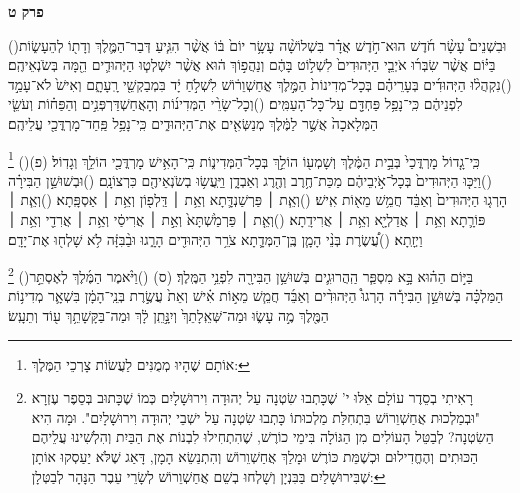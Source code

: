 \documentclass[12pt, openany]{book}
\newcommand{\chapname}{}
\newcommand{\newchap}[1]{
	\addcontentsline{toc}{chapter}{#1}
	\renewcommand{\chapname}{#1}
		\begin{center}
			\textbf{%
\fontsize{16pt}{16pt}\selectfont
				#1}
		\end{center}
}
\newcommand{\footnotecomment}[1]{
	\renewcommand\thefootnote{}
	\footnote{\textsf{#1}}}
\newcommand{\commenta}[1]{\footnotecomment{#1}\hspace{0em}}
\newcommand{\vsnum}[1]{(\hebrewnumeral{#1})\space}
\begin{document}
\newchap{פרק ט}
\begin{multicols}{2}
\vsnum{1}וּבִשְׁנֵים֩ עָשָׂ֨ר חֹ֜דֶשׁ הוּא־חֹ֣דֶשׁ אֲדָ֗ר בִּשְׁלוֹשָׁ֨ה עָשָׂ֥ר יוֹם֙ בּ֔וֹ אֲשֶׁ֨ר הִגִּ֧יעַ דְּבַר־הַמֶּ֛לֶךְ וְדָת֖וֹ לְהֵעָשׂ֑וֹת בַּיּ֗וֹם אֲשֶׁ֨ר שִׂבְּר֜וּ אֹיְבֵ֤י הַיְּהוּדִים֙ לִשְׁל֣וֹט בָּהֶ֔ם וְנַהֲפ֣וֹךְ ה֔וּא אֲשֶׁ֨ר יִשְׁלְט֧וּ הַיְּהוּדִ֛ים הֵ֖מָּה בְּשֹׂנְאֵיהֶֽם׃
\vsnum{2}נִקְהֲל֨וּ הַיְּהוּדִ֜ים בְּעָרֵיהֶ֗ם בְּכָל־מְדִינוֹת֙ הַמֶּ֣לֶךְ אֳחַשְׁוֵר֔וֹשׁ לִשְׁלֹ֣חַ יָ֔ד בִּמְבַקְשֵׁ֖י רָֽעָתָ֑ם וְאִישׁ֙ לֹא־עָמַ֣ד לִפְנֵיהֶ֔ם כִּֽי־נָפַ֥ל פַּחְדָּ֖ם עַל־כָּל־הָעַמִּֽים׃
\vsnum{3}וְכָל־שָׂרֵ֨י הַמְּדִינ֜וֹת וְהָאֲחַשְׁדַּרְפְּנִ֣ים וְהַפַּח֗וֹת וְעֹשֵׂ֤י הַמְּלָאכָה֙ אֲשֶׁ֣ר לַמֶּ֔לֶךְ מְנַשְּׂאִ֖ים אֶת־הַיְּהוּדִ֑ים כִּֽי־נָפַ֥ל פַּֽחַד־מָרְדֳּכַ֖י עֲלֵיהֶֽם׃%
\commenta{ אוֹתָם שֶׁהָיוּ מְמֻנִּים לַעֲשׂוֹת צָרְכֵי הַמֶּלֶךְ:}%
\vsnum{4}כִּֽי־גָ֤דוֹל מָרְדֳּכַי֙ בְּבֵ֣ית הַמֶּ֔לֶךְ וְשָׁמְע֖וֹ הוֹלֵ֣ךְ בְּכָל־הַמְּדִינ֑וֹת כִּֽי־הָאִ֥ישׁ מָרְדֳּכַ֖י הוֹלֵ֥ךְ וְגָדֽוֹל׃ (פ)
\vsnum{5}וַיַּכּ֤וּ הַיְּהוּדִים֙ בְּכָל־אֹ֣יְבֵיהֶ֔ם מַכַּת־חֶ֥רֶב וְהֶ֖רֶג וְאַבְדָ֑ן וַיַּֽעֲשׂ֥וּ בְשֹׂנְאֵיהֶ֖ם כִּרְצוֹנָֽם׃
\vsnum{6}וּבְשׁוּשַׁ֣ן הַבִּירָ֗ה הָרְג֤וּ הַיְּהוּדִים֙ וְאַבֵּ֔ד חֲמֵ֥שׁ מֵא֖וֹת אִֽישׁ׃
\vsnum{7}וְאֵ֧ת ׀ פַּרְשַׁנְדָּ֛תָא וְאֵ֥ת ׀ דַּֽלְפ֖וֹן וְאֵ֥ת ׀ אַסְפָּֽתָא׃
\vsnum{8}וְאֵ֧ת ׀ פּוֹרָ֛תָא וְאֵ֥ת ׀ אֲדַלְיָ֖א וְאֵ֥ת ׀ אֲרִידָֽתָא׃
\vsnum{9}וְאֵ֤ת ׀ פַּרְמַ֙שְׁתָּא֙ וְאֵ֣ת ׀ אֲרִיסַ֔י וְאֵ֥ת ׀ אֲרִדַ֖י וְאֵ֥ת ׀ וַיְזָֽתָא׃
\vsnum{10}עֲ֠שֶׂרֶת בְּנֵ֨י הָמָ֧ן בֶּֽן־הַמְּדָ֛תָא צֹרֵ֥ר הַיְּהוּדִ֖ים הָרָ֑גוּ וּבַ֨בִּזָּ֔ה לֹ֥א שָׁלְח֖וּ אֶת־יָדָֽם׃%
\commenta{ רָאִיתִי בְסֵדֶר עוֹלָם אֵלּוּ י' שֶׁכָּתְבוּ שִׂטְנָה עַל יְהוּדָה וִירוּשָׁלָיִם כְּמוֹ שֶׁכָּתוּב בְּסֵפֶר עֶזְרָא "וּבְמַלְכוּת אֲחַשְׁוֵרוֹשׁ בִּתְחִלַּת מַלְכוּתוֹ כָּתְבוּ שִׂטְנָה עַל ישְׁבֵי יְהוּדָה וִירוּשָׁלָיִם". וּמָה הִיא הַשִׂטְנָה? לְבַטֵּל הָעוֹלִים מִן הַגּוֹלָה בִּימֵי כוֹרֶשׁ, שֶׁהִתְחִילוּ לִבְנוֹת אֶת הַבַּיִת וְהִלְשִׁינוּ עֲלֵיהֶם הַכּוּתִים וְהֶחֱדִילוּם וּכְשֶׁמֵּת כּוֹרֶשׁ וּמָלַךְ אֲחַשְׁוֵרוֹשׁ וְהִתְנַשֵׂא הָמָן, דָּאַג שֶׁלֹּא יַעַסְקוּ אוֹתָן שֶׁבִּירוּשָׁלַיִם בַּבִּנְיָן וְשָׁלְחוּ בְשֵׁם אֲחַשְׁוֵרוֹשׁ לְשָׂרֵי עֵבֶר הַנָּהָר לְבַטְּלָן: }%
\vsnum{11}בַּיּ֣וֹם הַה֗וּא בָּ֣א מִסְפַּ֧ר הַֽהֲרוּגִ֛ים בְּשׁוּשַׁ֥ן הַבִּירָ֖ה לִפְנֵ֥י הַמֶּֽלֶךְ׃ (ס)
\vsnum{12}וַיֹּ֨אמֶר הַמֶּ֜לֶךְ לְאֶסְתֵּ֣ר הַמַּלְכָּ֗ה בְּשׁוּשַׁ֣ן הַבִּירָ֡ה הָרְגוּ֩ הַיְּהוּדִ֨ים וְאַבֵּ֜ד חֲמֵ֧שׁ מֵא֣וֹת אִ֗ישׁ וְאֵת֙ עֲשֶׂ֣רֶת בְּנֵֽי־הָמָ֔ן בִּשְׁאָ֛ר מְדִינ֥וֹת הַמֶּ֖לֶךְ מֶ֣ה עָשׂ֑וּ וּמַה־שְּׁאֵֽלָתֵךְ֙ וְיִנָּ֣תֵֽן לָ֔ךְ וּמַה־בַּקָּשָׁתֵ֥ךְ ע֖וֹד וְתֵעָֽשׂ׃

\end{multicols}
\end{document}
